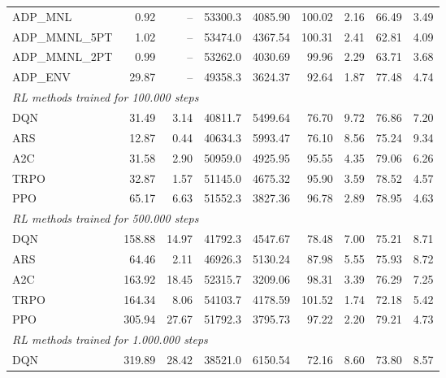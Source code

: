 \begin{samepage}
\begin{center}
\begin{tabular}{l|rr|rr|rr|rr}
    \midrule
    ADP\_MNL     &     0.92 &    -- &    53300.3 &    4085.90 &  100.02 &    2.16 &   66.49 &    3.49 \\
    ADP\_MMNL\_5PT &     1.02 &    -- &    53474.0 &    4367.54 &  100.31 &    2.41 &   62.81 &    4.09 \\
    ADP\_MMNL\_2PT &     0.99 &    -- &    53262.0 &    4030.69 &   99.96 &    2.29 &   63.71 &    3.68 \\
    ADP\_ENV     &    29.87 &    -- &    49358.3 &    3624.37 &   92.64 &    1.87 &   77.48 &    4.74 \\
    \midrule
    \multicolumn{9}{l}{\textit{RL methods trained for 100.000 steps}} \\
    \midrule
    DQN          &    31.49 &     3.14 &    40811.7 &    5499.64 &   76.70 &    9.72 &   76.86 &    7.20 \\
    ARS          &    12.87 &     0.44 &    40634.3 &    5993.47 &   76.10 &    8.56 &   75.24 &    9.34 \\
    A2C          &    31.58 &     2.90 &    50959.0 &    4925.95 &   95.55 &    4.35 &   79.06 &    6.26 \\
    TRPO         &    32.87 &     1.57 &    51145.0 &    4675.32 &   95.90 &    3.59 &   78.52 &    4.57 \\
    PPO          &    65.17 &     6.63 &    51552.3 &    3827.36 &   96.78 &    2.89 &   78.95 &    4.63 \\
    \midrule
    \multicolumn{9}{l}{\textit{RL methods trained for 500.000 steps}} \\
    \midrule
    DQN          &   158.88 &    14.97 &    41792.3 &    4547.67 &   78.48 &    7.00 &   75.21 &    8.71 \\
    ARS          &    64.46 &     2.11 &    46926.3 &    5130.24 &   87.98 &    5.55 &   75.93 &    8.72 \\
    A2C          &   163.92 &    18.45 &    52315.7 &    3209.06 &   98.31 &    3.39 &   76.29 &    7.25 \\
    TRPO         &   164.34 &     8.06 &    54103.7 &    4178.59 &  101.52 &    1.74 &   72.18 &    5.42 \\
    PPO          &   305.94 &    27.67 &    51792.3 &    3795.73 &   97.22 &    2.20 &   79.21 &    4.73 \\
    \midrule
    \multicolumn{9}{l}{\textit{RL methods trained for 1.000.000 steps}} \\
    \midrule
    DQN          &   319.89 &    28.42 &    38521.0 &    6150.54 &   72.16 &    8.60 &   73.80 &    8.57 \\

\end{tabular}
\end{center}
\end{samepage}
